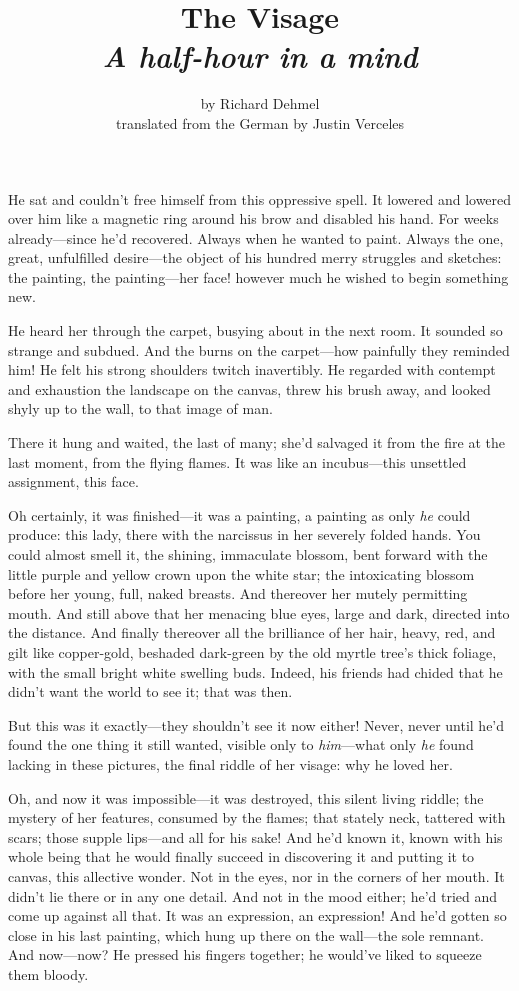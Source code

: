 \documentclass[12pt,a4paper]{article}
\title{The Visage\\ \large{\textit{A half-hour in a mind}}}
\author{by Richard Dehmel\\translated from the German by Justin Verceles}
\date{}
\begin{document}
\maketitle
He sat and couldn’t free himself from this oppressive spell. It lowered and lowered over him like a magnetic ring around his brow and disabled his hand. For weeks already—since he’d recovered. Always when he wanted to paint. Always the one, great, unfulfilled desire—the object of his hundred merry struggles and sketches: the painting, the painting—her face! however much he wished to begin something new.

He heard her through the carpet, busying about in the next room. It sounded so strange and subdued. And the burns on the carpet—how painfully they reminded him! He felt his strong shoulders twitch inavertibly. He regarded with contempt and exhaustion the landscape on the canvas, threw his brush away, and looked shyly up to the wall, to that image of man.

There it hung and waited, the last of many; she’d salvaged it from the fire at the last moment, from the flying flames. It was like an incubus—this unsettled assignment, this face.

Oh certainly, it was finished—it was a painting, a painting as only \textit{he} could produce: this lady, there with the narcissus in her severely folded hands. You could almost smell it, the shining, immaculate blossom, bent forward with the little purple and yellow crown upon the white star; the intoxicating blossom before her young, full, naked breasts. And thereover her mutely permitting mouth. And still above that her menacing blue eyes, large and dark, directed into the distance. And finally thereover all the brilliance of her hair, heavy, red, and gilt like copper-gold, beshaded dark-green by the old myrtle tree’s thick foliage, with the small bright white swelling buds. Indeed, his friends had chided that he didn’t want the world to see it; that was then.

But this was it exactly—they shouldn’t see it now either! Never, never until he’d found the one thing it still wanted, visible only to \textit{him}—what only \textit{he} found lacking in these pictures, the final riddle of her visage: why he loved her.

Oh, and now it was impossible—it was destroyed, this silent living riddle; the mystery of her features, consumed by the flames; that stately neck, tattered with scars; those supple lips—and all for his sake! And he’d known it, known with his whole being that he would finally succeed in discovering it and putting it to canvas, this allective wonder. Not in the eyes, nor in the corners of her mouth. It didn’t lie there or in any one detail. And not in the mood either; he’d tried and come up against all that. It was an expression, an expression! And he’d gotten so close in his last painting, which hung up there on the wall—the sole remnant. And now—now? He pressed his fingers together; he would’ve liked to squeeze them bloody.
\end{document}
